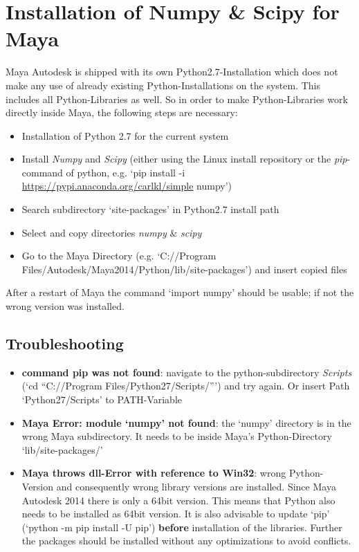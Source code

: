 \documentclass[letterpaper,10pt,english]{sphinxmanual}
\begin{document}
\section{Installation of Numpy \& Scipy for Maya}
\label{index:installation-of-numpy-scipy-for-maya}
Maya Autodesk is shipped with its own Python2.7-Installation which does not make any use of already existing Python-Installations on the system. This includes all Python-Libraries as well. So in order to make Python-Libraries work directly inside Maya, the following steps are necessary:
\begin{itemize}
\item {} 
Installation of Python 2.7 for the current system

\item {} 
Install \emph{Numpy} and \emph{Scipy} (either using the Linux install repository or the \emph{pip}-command of python, e.g. `pip install -i \url{https://pypi.anaconda.org/carlkl/simple} numpy')

\item {} 
Search subdirectory `site-packages' in Python2.7 install path

\item {} 
Select and copy directories \emph{numpy} \& \emph{scipy}

\item {} 
Go to the Maya Directory (e.g. `C://Program Files/Autodesk/Maya2014/Python/lib/site-packages') and insert copied files

\end{itemize}

After a restart of Maya the command `import numpy' should be usable; if not the wrong version was installed.


\subsection{Troubleshooting}
\label{index:troubleshooting}\begin{itemize}
\item {} 
\textbf{command pip was not found}: navigate to the python-subdirectory \emph{Scripts} (`cd ``C://Program Files/Python27/Scripts/''') and try again. Or insert Path `Python27/Scripts' to PATH-Variable

\item {} 
\textbf{Maya Error: module `numpy' not found}: the `numpy' directory is in the wrong Maya subdirectory. It needs to be inside Maya's Python-Directory `lib/site-packages/'

\item {} 
\textbf{Maya throws dll-Error with reference to Win32}: wrong Python-Version and consequently wrong library versions are installed. Since Maya Autodesk 2014 there is only a 64bit version. This means that Python also needs to be installed as 64bit version. It is also advisable to update `pip' (`python -m pip install -U pip') \textbf{before} installation of the libraries. Further the packages should be installed without any optimizations to avoid conflicts.

\end{itemize}
\end{document}
